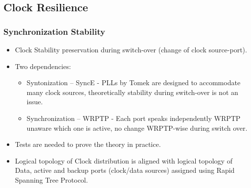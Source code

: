 \documentclass[]{beamer}
\begin{document}
\subsection{Clock Resilience}
\begin{frame}
  \frametitle{Synchronization Stability}   

\begin{itemize}
  \item Clock Stability preservation during switch-over (change of clock
        source-port).
  \item Two dependencies:
  \begin{itemize}
    \item Syntonization -- SyncE - PLLs by Tomek are designed to accommodate
          many clock sources, theoretically stability during switch-over is not
          an issue.
    \item Synchronization -- WRPTP - Each port speaks independently WRPTP
          unaware which one is active, no change WRPTP-wise during switch over.
  \end{itemize}
 \item Tests are needed to prove the theory in practice.
 \item Logical topology of Clock distribution is aligned with logical topology
       of Data, active and backup ports (clock/data sources) assigned
       using Rapid Spanning Tree Protocol.
\end{itemize}

\end{frame}

\end{document}
